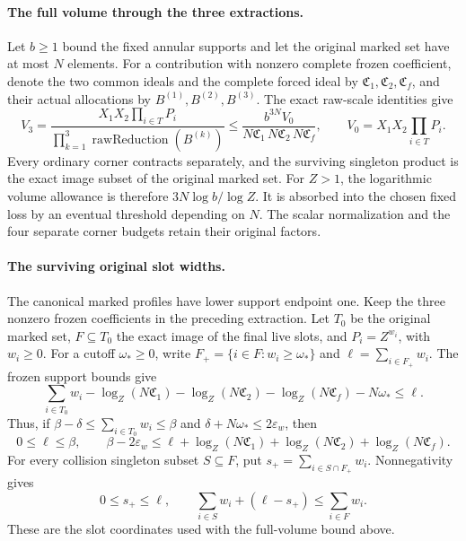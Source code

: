 \paragraph{The full volume through the three extractions.}
Let \(b\ge1\) bound the fixed annular supports and let the original
marked set have at most \(N\) elements. For a contribution with
nonzero complete frozen coefficient, denote the two common ideals and
the complete forced ideal by \(\mathfrak C_1,\mathfrak C_2,
\mathfrak C_f\), and their actual allocations by \(B^{(1)},B^{(2)},
B^{(3)}\). The exact raw-scale identities give
\[
 V_3=\frac{X_1X_2\prod_{i\in T}P_i}
 {\prod_{k=1}^3\operatorname{rawReduction}(B^{(k)})}
 \le \frac{b^{3N}V_0}
 {N\mathfrak C_1\,N\mathfrak C_2\,N\mathfrak C_f},
 \qquad V_0=X_1X_2\prod_{i\in T}P_i.
\]
Every ordinary corner contracts separately, and the surviving singleton
product is the exact image subset of the original marked set.
For \(Z>1\), the logarithmic volume allowance is therefore
\(3N\log b/\log Z\). It is absorbed into the chosen fixed loss by
an eventual threshold depending on \(N\). The scalar normalization
and the four separate corner budgets retain their original factors.

\paragraph{The surviving original slot widths.}
The canonical marked profiles have lower support endpoint one. Keep
the three nonzero frozen coefficients in the preceding extraction.
Let \(T_0\) be the original marked set, \(F\subseteq T_0\) the
exact image of the final live slots, and \(P_i=Z^{w_i}\), with
\(w_i\ge0\). For a cutoff \(\omega_*\ge0\), write
\(F_+=\{i\in F:w_i\ge\omega_*\}\) and
\(\ell=\sum_{i\in F_+}w_i\). The frozen support bounds give
\[
 \sum_{i\in T_0}w_i
 -\log_Z(N\mathfrak C_1)-\log_Z(N\mathfrak C_2)
 -\log_Z(N\mathfrak C_f)-N\omega_*\le\ell.
\]
Thus, if \(\beta-\delta\le\sum_{i\in T_0}w_i\le\beta\) and
\(\delta+N\omega_*\le2\varepsilon_w\), then
\[
 0\le\ell\le\beta,\qquad
 \beta-2\varepsilon_w\le
 \ell+\log_Z(N\mathfrak C_1)+\log_Z(N\mathfrak C_2)
       +\log_Z(N\mathfrak C_f).
\]
For every collision singleton subset \(S\subseteq F\), put
\(s_+=\sum_{i\in S\cap F_+}w_i\). Nonnegativity gives
\[
 0\le s_+\le\ell,\qquad
 \sum_{i\in S}w_i+(\ell-s_+)\le\sum_{i\in F}w_i.
\]
These are the slot coordinates used with the full-volume bound above.


